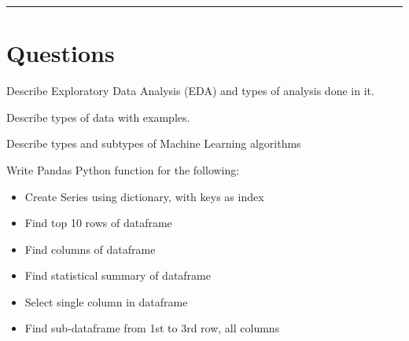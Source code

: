 \documentclass[11pt,paper=a4]{exam}
\begin{document}
\rule{\textwidth}{1pt}
\section*{Questions}

\begin{questions}
\question[4] Describe Exploratory Data Analysis (EDA) and types of analysis done in it.

\question[6] Describe types of data with examples.

\question[4] Describe types and subtypes of Machine Learning algorithms 

\question[6] Write Pandas Python function for the following:

				\begin{itemize}
				\item Create Series using dictionary, with keys as index 
				\item Find top 10 rows of dataframe
				\item Find columns of dataframe
				\item Find statistical summary of dataframe
				\item Select single column in dataframe
				\item Find sub-dataframe from 1st to 3rd row, all columns
				\end{itemize}

\end{questions}
\end{document}
